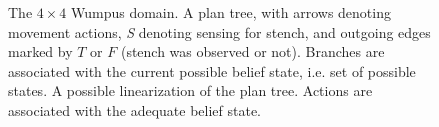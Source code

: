 \documentclass[letterpaper]{article}
\numberwithin{equation}{section}	%
\begin{document}
\begin{figure}[ht!]
\centering
\begin{minipage}{.38\textwidth}
\centering
{}
\end{minipage}
\begin{minipage}{.6\textwidth}
\centering
{}
\end{minipage}
\caption{The $4 \times 4$ Wumpus domain. A plan tree, with arrows denoting movement actions, {\em S} denoting sensing for stench, and outgoing edges marked by $T$ or $F$ (stench was observed or not). Branches are associated with the current possible belief state, i.e. set of possible states. A possible linearization of the plan tree. Actions are associated with the adequate belief state.}
\end{figure}
\end{document}
